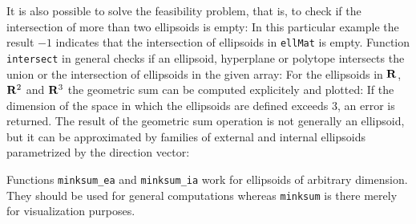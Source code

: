 It is also possible to solve the feasibility problem, that is, to check
if the intersection of more than two ellipsoids is empty:
In this particular example the result $-1$ indicates that the intersection
of ellipsoids in {\tt ellMat} is empty.
Function {\tt intersect} in general checks if an ellipsoid,
hyperplane or polytope intersects the union or the intersection
of ellipsoids in the given array:
For the ellipsoids in ${\bf R}$, ${\bf R}^2$ and ${\bf R}^3$ the geometric
sum can be computed explicitely and plotted:
If the dimension of the space in which the ellipsoids are defined exceeds $3$,
an error is returned. The result of the geometric sum operation is
not generally an ellipsoid, but it can be approximated by families
of external and internal ellipsoids parametrized by the direction vector:

Functions {\tt minksum\_ea} and {\tt minksum\_ia} work for ellipsoids of
arbitrary dimension. They should be used for general computations
whereas {\tt minksum} is there merely for visualization purposes.

